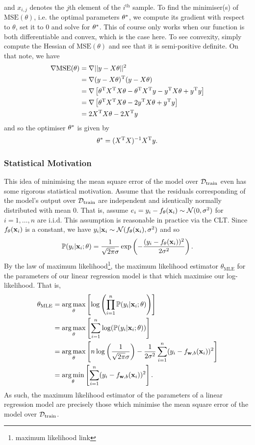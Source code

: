 \documentclass[11pt]{article}
\begin{document}
and $x_{i,j}$ denotes the $j$th element of the $i^{\text{th}}$ sample. To find the minimiser(s) of $\text{MSE}(\theta)$, i.e. the optimal parameters $\theta^{*}$, we compute its gradient with respect to $\theta$, set it to $0$ and solve for $\theta^{*}$. This of course only works when our function is both differentiable and convex, which is the case here. To see convexity, simply compute the Hessian of $\text{MSE}(\theta)$ and see that it is semi-positive definite. On that note, we have
\begin{align*}
    \nabla\text{MSE}(\theta)
    &=
    \nabla||y-X\theta||^2\\
    &=
    \nabla(y-X\theta)^{\text{T}}(y-X\theta)\\
    &=
    \nabla\left[\theta^{\text{T}}X^{\text{T}}X\theta-\theta^{\text{T}}X^{\text{T}}y-y^{\text{T}}X\theta+y^{\text{T}}y\right]\\
    &=
    \nabla\left[\theta^{\text{T}}X^{\text{T}}X\theta-2y^{\text{T}}X\theta+y^{\text{T}}y\right]\\
    &=
    2X^{\text{T}}X\theta-2X^{\text{T}}y
\end{align*}
and so the optimiser $\theta^{*}$ is given by
$$
\theta^{*}=(X^{\text{T}}X)^{-1}X^{\text{T}}y.
$$

\subsubsection{Statistical Motivation}

This idea of minimising the mean square error of the model over $\mathcal{D}_{\text{train}}$ even has some rigorous statistical motivation. Assume that the residuals corresponding of the model's output over $\mathcal{D}_{\text{train}}$ are independent and identically normally distributed with mean 0. That is, assume $e_i=y_i-f_{\theta}(\mathbf{x}_i)\sim\mathcal{N}(0, \sigma^2)$ for $i=1,\dots,n$ are i.i.d. This assumption is reasonable in practice via the CLT. Since $f_{\theta}(\mathbf{x}_i)$ is a constant, we have $y_i|\mathbf{x}_i\sim\mathcal{N}(f_{\theta}(\mathbf{x}_i), \sigma^2)$ and so
$$
\mathbb{P}(y_i|\mathbf{x}_i;\theta)=\frac{1}{\sqrt{2\pi}\sigma}\exp\left(-\frac{(y_i-f_{\theta}(\mathbf{x}_i))^2}{2\sigma^2}\right).
$$
By the law of maximum likelihood\footnote{maximum likelihood link}, the maximum likelihood estimator $\theta_{\text{MLE}}$ for the parameters of our linear regression model is that which maximise our log-likelihood. That is,
\begin{align*}
    \theta_{\text{MLE}}&=\operatorname*{arg\,max}_{\theta}\left[\log\left(\prod_{i=1}^n\mathbb{P}(y_i|\mathbf{x}_i;\theta)\right)\right]\\
    &=\operatorname*{arg\,max}_{\theta}\left[\sum_{i=1}^n\log(\mathbb{P}(y_i|\mathbf{x}_i;\theta))\right]\\
    &=\operatorname*{arg\,max}_{\theta}\left[n\log\left(\frac{1}{\sqrt{2\pi}\sigma}\right)-\frac{1}{2\sigma^2}\sum_{i=1}^n(y_i-f_{\mathbf{w},b}(\mathbf{x}_i))^2\right]\\
    &=\operatorname*{arg\,min}_{\theta}\left[\sum_{i=1}^n(y_i-f_{\mathbf{w},b}(\mathbf{x}_i))^2\right].
\end{align*}
As such, the maximum likelihood estimator of the parameters of a linear regression model are precisely those which minimise the mean square error of the model over $\mathcal{D}_{\text{train}}$.
\end{document}
